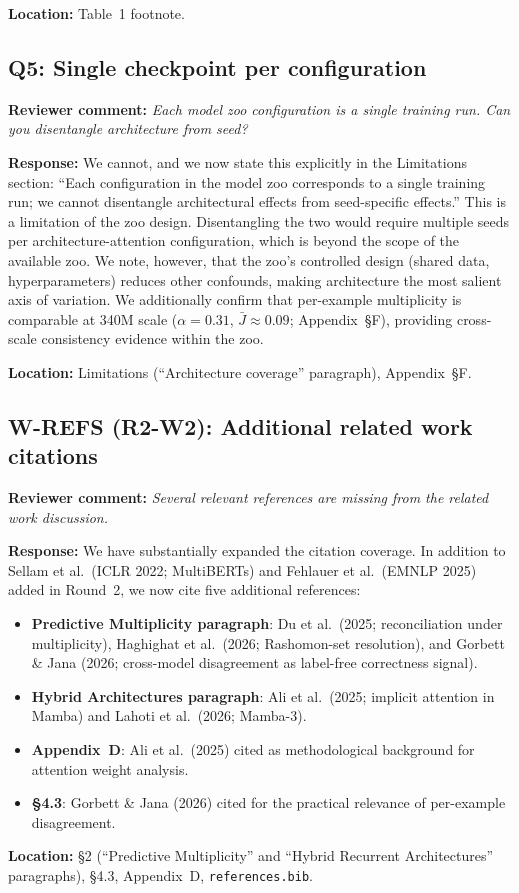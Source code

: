 \documentclass[11pt]{article}
\newcommand{\reviewer}[1]{\textcolor{reviewercolor}{\textbf{Reviewer comment:} \textit{#1}}}
\newcommand{\response}[1]{\textcolor{responsecolor}{\textbf{Response:} #1}}
\newcommand{\location}[1]{\textbf{Location:} #1}
\begin{document}
\location{Table~1 footnote.}

\subsection*{Q5: Single checkpoint per configuration}

\reviewer{Each model zoo configuration is a single training run. Can you disentangle architecture from seed?}

\response{We cannot, and we now state this explicitly in the Limitations section: ``Each configuration in the model zoo corresponds to a single training run; we cannot disentangle architectural effects from seed-specific effects.'' This is a limitation of the zoo design. Disentangling the two would require multiple seeds per architecture-attention configuration, which is beyond the scope of the available zoo. We note, however, that the zoo's controlled design (shared data, hyperparameters) reduces other confounds, making architecture the most salient axis of variation. We additionally confirm that per-example multiplicity is comparable at 340M scale ($\alpha = 0.31$, $\bar{J} \approx 0.09$; Appendix~\S F), providing cross-scale consistency evidence within the zoo.}

\location{Limitations (``Architecture coverage'' paragraph), Appendix~\S F.}

\subsection*{W-REFS (R2-W2): Additional related work citations}

\reviewer{Several relevant references are missing from the related work discussion.}

\response{We have substantially expanded the citation coverage. In addition to Sellam et al.\ (ICLR 2022; MultiBERTs) and Fehlauer et al.\ (EMNLP 2025) added in Round~2, we now cite five additional references:}
\begin{itemize}[leftmargin=2em]
\item \textbf{Predictive Multiplicity paragraph}: Du et al.\ (2025; reconciliation under multiplicity), Haghighat et al.\ (2026; Rashomon-set resolution), and Gorbett \& Jana (2026; cross-model disagreement as label-free correctness signal).
\item \textbf{Hybrid Architectures paragraph}: Ali et al.\ (2025; implicit attention in Mamba) and Lahoti et al.\ (2026; Mamba-3).
\item \textbf{Appendix~D}: Ali et al.\ (2025) cited as methodological background for attention weight analysis.
\item \textbf{\S4.3}: Gorbett \& Jana (2026) cited for the practical relevance of per-example disagreement.
\end{itemize}

\location{\S2 (``Predictive Multiplicity'' and ``Hybrid Recurrent Architectures'' paragraphs), \S4.3, Appendix~D, \texttt{references.bib}.}
\end{document}
